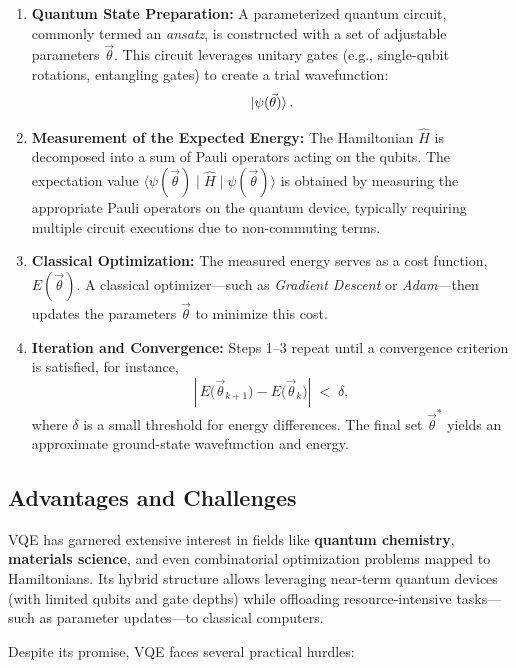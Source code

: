 \begin{enumerate}
    \item \textbf{Quantum State Preparation:} 
    A parameterized quantum circuit, commonly termed an \emph{ansatz}, is constructed with a set of adjustable parameters \(\vec{\theta}\). This circuit leverages unitary gates (e.g., single-qubit rotations, entangling gates) to create a trial wavefunction:
    \[
    \ket{\psi(\vec{\theta})}.
    \]

    \item \textbf{Measurement of the Expected Energy:}
    The Hamiltonian \(\hat{H}\) is decomposed into a sum of Pauli operators acting on the qubits. The expectation value 
    \(\langle \psi(\vec{\theta}) \mid \hat{H} \mid \psi(\vec{\theta}) \rangle\)
    is obtained by measuring the appropriate Pauli operators on the quantum device, typically requiring multiple circuit executions due to non-commuting terms.

    \item \textbf{Classical Optimization:}
    The measured energy serves as a cost function, \(E(\vec{\theta})\). A classical optimizer---such as \emph{Gradient Descent} or \emph{Adam}---then updates the parameters \(\vec{\theta}\) to minimize this cost.

    \item \textbf{Iteration and Convergence:}
    Steps 1--3 repeat until a convergence criterion is satisfied, for instance,
    \[
    \left|\,E\bigl(\vec{\theta}_{k+1}\bigr) - E\bigl(\vec{\theta}_{k}\bigr)\right|
    \;<\;\delta,
    \]
    where \(\delta\) is a small threshold for energy differences. The final set \(\vec{\theta}^{*}\) yields an approximate ground-state wavefunction and energy.
\end{enumerate}

\subsection{Advantages and Challenges}
\label{subsec:vqe_challenges}

VQE has garnered extensive interest in fields like \textbf{quantum chemistry}, \textbf{materials science}, and even combinatorial optimization problems mapped to Hamiltonians. Its hybrid structure allows leveraging near-term quantum devices (with limited qubits and gate depths) while offloading resource-intensive tasks---such as parameter updates---to classical computers. 

Despite its promise, VQE faces several practical hurdles:

